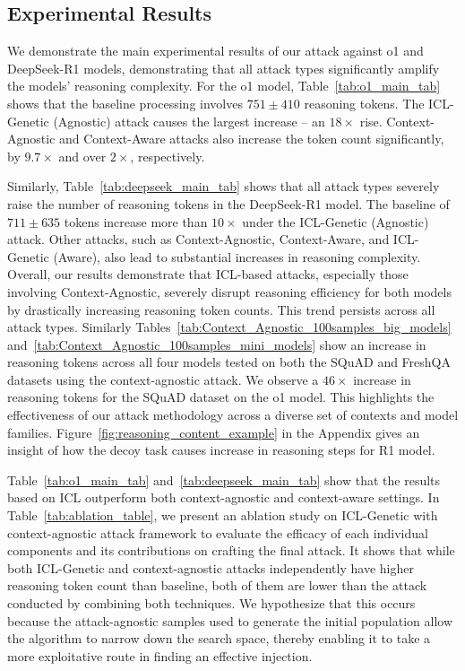 \subsection{Experimental Results}
We demonstrate the main experimental results of our \sys attack against o1 and DeepSeek-R1 models, demonstrating that all attack types significantly amplify the models' reasoning complexity. For the o1 model, Table~\ref{tab:o1_main_tab} shows that the baseline processing involves $751\pm410$ reasoning tokens. The ICL-Genetic (Agnostic) attack causes the largest increase -- an $18\times$ rise. Context-Agnostic and Context-Aware attacks also increase the token count significantly, by $9.7\times$ and over $2\times$, respectively. 

Similarly, Table~\ref{tab:deepseek_main_tab} shows that all attack types severely raise the number of reasoning tokens in the DeepSeek-R1 model. The baseline of $711\pm635$ tokens increase more than $10\times$ under the ICL-Genetic (Agnostic) attack. Other attacks, such as Context-Agnostic, Context-Aware, and ICL-Genetic (Aware), also lead to substantial increases in reasoning complexity. Overall, our results demonstrate that ICL-based attacks, especially those involving Context-Agnostic, severely disrupt reasoning efficiency for both models by drastically increasing reasoning token counts. This trend persists across all attack types. Similarly Tables~\ref{tab:Context_Agnostic_100samples_big_models} and~\ref{tab:Context_Agnostic_100samples_mini_models} show an increase in reasoning tokens across all four models tested on both the SQuAD and FreshQA datasets using the context-agnostic attack. We observe a $46\times$ increase in reasoning tokens for the SQuAD dataset on the o1 model. This highlights the effectiveness of our attack methodology across a diverse set of contexts and model families. Figure~\ref{fig:reasoning_content_example} in the Appendix gives an insight of how the decoy task causes increase in  reasoning steps for R1 model.

Table~\ref{tab:o1_main_tab} and~\ref{tab:deepseek_main_tab} show that the results based on ICL outperform both context-agnostic and context-aware settings. In Table~\ref{tab:ablation_table}, we present an ablation study on ICL-Genetic with context-agnostic attack framework to evaluate the efficacy of each individual components and its contributions on crafting the final attack. It shows that while both ICL-Genetic and context-agnostic attacks independently have higher reasoning token count than baseline, both of them are lower than the attack  conducted by combining both techniques. We hypothesize that this occurs because the attack-agnostic samples used to generate the initial population allow the algorithm to narrow down the search space, thereby enabling it to take a more exploitative route in finding an effective injection.


